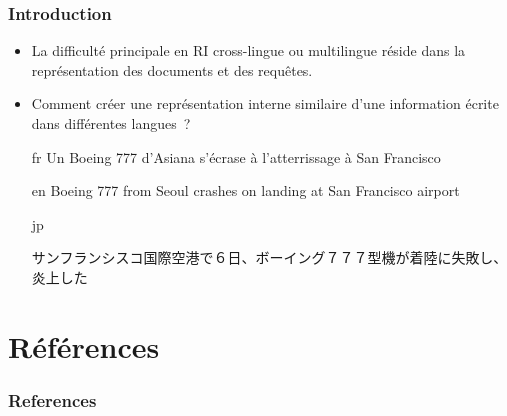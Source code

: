 \documentclass[12pt,aspectratio=43,dvipsnames,table]{beamer}
\begin{document}
\begin{frame}
    \frametitle{Introduction}
    \begin{itemize} \itemsep10pt
        \item La difficulté principale en RI cross-lingue ou multilingue réside 
              dans la représentation des documents et des requêtes.
        \item Comment créer une représentation interne similaire d'une 
              information écrite dans différentes langues~?
        \item[fr] {\small Un Boeing 777 d'Asiana s'écrase à l'atterrissage à
                  San Francisco}
                  \vspace*{-0.8em}
        \item[en] {\small Boeing 777 from Seoul crashes on landing at San 
                  Francisco airport}
                  \vspace*{-0.8em}
        \item[jp] {\small \begin{CJK}{UTF8}{min}サンフランシスコ国際空港で６日、ボーイング７７７型機が着陸に失敗し、炎上した\end{CJK}}
    \end{itemize}
\end{frame}


\begin{frame}
    \frametitle{}
\end{frame}


\section{Références}


\begin{frame}[allowframebreaks]
    \frametitle{References}
    
    
\end{frame}
\end{document}
